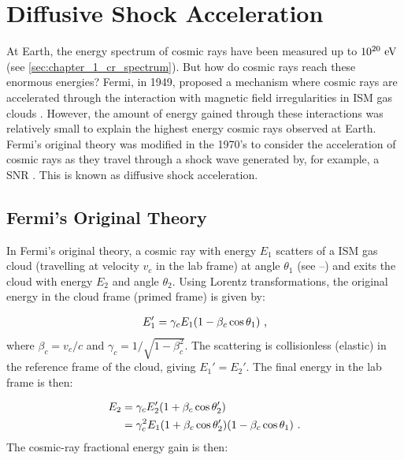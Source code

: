 \chapter{Diffusive Shock Acceleration} \label{A3_DSA}

At Earth, the energy spectrum of cosmic rays have been measured up to $10^{20}~\si{\electronvolt}$ (see \autoref{sec:chapter_1_cr_spectrum}). But how do cosmic rays reach these enormous energies? Fermi, in 1949, proposed a mechanism where cosmic rays are accelerated through the interaction with magnetic field irregularities in ISM gas clouds \citep{1949PhRv...75.1169F}. However, the amount of energy gained through these interactions was relatively small to explain the highest energy cosmic rays observed at Earth. Fermi's original theory was modified in the 1970's to consider the acceleration of cosmic rays as they travel through a shock wave generated by, for example, a SNR \citep{1977DoSSR.234.1306K,1977ICRC...11..132A,1978MNRAS.182..147B,1978MNRAS.182..443B,1978ApJ...221L..29B}. This is known as diffusive shock acceleration.

\section{Fermi's Original Theory}

In Fermi's original theory, a cosmic ray with energy $E_1$  scatters of a ISM gas cloud (travelling at velocity $v_c$ in the lab frame) at angle $\theta_1$ (see --) and exits the cloud with energy $E_2$ and angle $\theta_2$. Using Lorentz transformations, the original energy in the cloud frame (primed frame) is given by:

\begin{equation}
    \begin{aligned}
        E_1'=\gamma_cE_1\qty(1-\beta_c\cos\theta_1)\text{ ,}
    \end{aligned}
\end{equation}
\noindent where $\beta_c=v_c/c$ and $\gamma_c=1/\sqrt{1-\beta_c^2}$. The scattering is collisionless (elastic) in the reference frame of the cloud, giving $E_1'=E_2'$. The final energy in the lab frame is then:

\begin{equation}
    \begin{aligned}
        E_2&=\gamma_c E_2'\qty(1+\beta_c\cos\theta_2') \\
        &=\gamma_c^2E_1\qty(1+\beta_c\cos\theta_2')\qty(1-\beta_c\cos\theta_1) \text{ .}
    \end{aligned}
\end{equation}
\noindent The cosmic-ray fractional energy gain is then:

